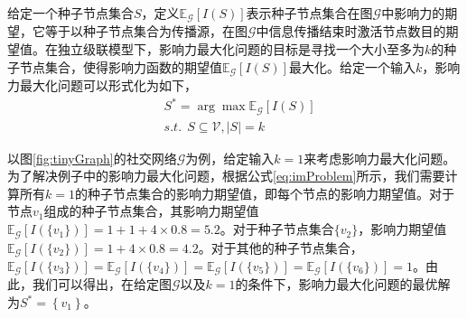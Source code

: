 给定一个种子节点集合$S$，定义$\mathbb{E}_\mathcal{G}\left[I\left(S\right)\right]$表示种子节点集合在图$\mathcal{G}$中影响力的期望，它等于以种子节点集合为传播源，在图$\mathcal{G}$中信息传播结束时激活节点数目的期望值。在独立级联模型下，影响力最大化问题的目标是寻找一个大小至多为$k$的种子节点集合，使得影响力函数的期望值$\mathbb{E}_\mathcal{G}\left[I\left(S\right)\right]$最大化。给定一个输入$k$，影响力最大化问题可以形式化为如下，
\begin{equation}\label{eq:imProblem}
    \begin{split}
        &S^{\ast} = \arg\max{\mathbb{E}_\mathcal{G}\left[I\left(S\right)\right]}\\
        &s.t.~~S \subseteq \mathcal{V},\left\vert{S}\right\vert = k
    \end{split}
\end{equation}

以图\ref{fig:tinyGraph}的社交网络$\mathcal{G}$为例，给定输入$k=1$来考虑影响力最大化问题。为了解决例子中的影响力最大化问题，根据公式\ref{eq:imProblem}所示，我们需要计算所有$k=1$的种子节点集合的影响力期望值，即每个节点的影响力期望值。对于节点$v_1$组成的种子节点集合，其影响力期望值$\mathbb{E}_\mathcal{G}\left[I\left(\{v_1\}\right)\right]=1+1+4\times0.8=5.2$。对于种子节点集合$\{v_2\}$，影响力期望值$\mathbb{E}_\mathcal{G}\left[I\left(\{v_2\}\right)\right]=1+4\times0.8=4.2$。对于其他的种子节点集合，$\mathbb{E}_\mathcal{G}\left[I\left(\{v_3\}\right)\right]=
\mathbb{E}_\mathcal{G}\left[I\left(\{v_4\}\right)\right]=
\mathbb{E}_\mathcal{G}\left[I\left(\{v_5\}\right)\right]=
\mathbb{E}_\mathcal{G}\left[I\left(\{v_6\}\right)\right]=1$。由此，我们可以得出，在给定图$\mathcal{G}$以及$k=1$的条件下，影响力最大化问题的最优解为$S^\ast=\left\{v_1\right\}$。

